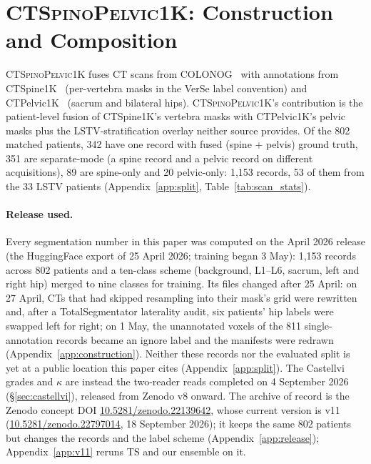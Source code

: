 \documentclass{article}
\newcommand{\dataset}{\textsc{CTSpinoPelvic1K}}
\newcommand{\TS}{TotalSegmentator}
\newcommand{\sota}{TS}
\newcommand{\VerSe}{VerSe}
\begin{document}
\section{\dataset{}: Construction and Composition}
\label{sec:dataset}

\dataset{} fuses CT scans from
COLONOG~\citep{Smith2015DataCOLONOGRAPHY} with annotations
from CTSpine1K~\citep{Deng2021CTSpine1K:Tomography}
(per-vertebra masks in the \VerSe{} label convention) and
CTPelvic1K~\citep{Liu2021DeepModels} (sacrum and bilateral
hips). \dataset{}'s contribution is the patient-level
fusion of CTSpine1K's vertebra masks with CTPelvic1K's
pelvic masks plus the LSTV-stratification overlay neither
source provides. Of the 802 matched patients, 342 have one
record with fused (spine + pelvis) ground truth, 351 are
separate-mode (a spine record and a pelvic record on
different acquisitions), 89 are spine-only and 20
pelvic-only: 1{,}153 records, 53 of them from the 33 LSTV
patients (Appendix~\ref{app:split},
Table~\ref{tab:scan_stats}).

\paragraph{Release used.}
Every segmentation number in this paper was computed on
the April 2026 release (the HuggingFace export of 25 April
2026; training began 3 May): 1{,}153
records across 802 patients and a ten-class scheme
(background, L1--L6, sacrum, left and right hip) merged
to nine classes for training. Its files changed after
25 April: on 27 April, CTs that had skipped resampling
into their mask's grid were rewritten and, after a \TS{}
laterality audit, six patients' hip labels were swapped
left for right; on 1 May, the unannotated voxels of the
811 single-annotation records became an ignore label and
the manifests were redrawn
(Appendix~\ref{app:construction}). Neither these records nor
the evaluated split is yet at a public location this
paper cites (Appendix~\ref{app:split}). The Castellvi
grades and $\kappa$ are instead the two-reader reads
completed on 4 September 2026 (\S\ref{sec:castellvi}),
released from Zenodo v8 onward.
The archive of record is the Zenodo concept DOI
\href{https://doi.org/10.5281/zenodo.22139642}{10.5281/zenodo.22139642},
whose current version is v11
(\href{https://doi.org/10.5281/zenodo.22797014}{10.5281/zenodo.22797014},
18 September 2026); it keeps the same 802 patients but
changes the records and the label scheme
(Appendix~\ref{app:release}); Appendix~\ref{app:v11}
reruns \sota{} and our ensemble on it.
\end{document}
